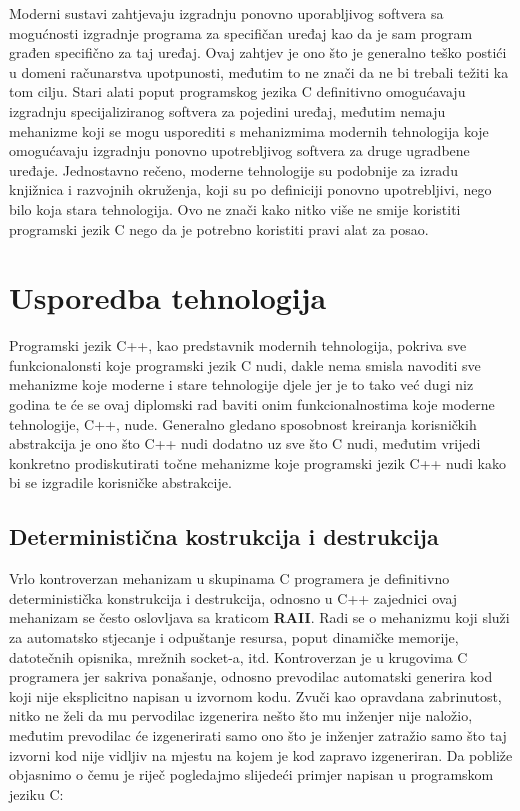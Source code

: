 Moderni sustavi zahtjevaju izgradnju ponovno uporabljivog softvera sa mogućnosti izgradnje programa za specifičan uređaj kao da je sam program građen specifično za taj uređaj. Ovaj zahtjev je ono što je generalno teško postići u domeni računarstva upotpunosti, međutim to ne znači da ne bi trebali težiti ka tom cilju. Stari alati poput programskog jezika C definitivno omogućavaju izgradnju specijaliziranog softvera za pojedini uređaj, međutim nemaju mehanizme koji se mogu usporediti s mehanizmima modernih tehnologija koje omogućavaju izgradnju ponovno upotrebljivog softvera za druge ugradbene uređaje. Jednostavno rečeno, moderne tehnologije su podobnije za izradu knjižnica i razvojnih okruženja, koji su po definiciji ponovno upotrebljivi, nego bilo koja stara tehnologija. Ovo ne znači kako nitko više ne smije koristiti programski jezik C nego da je potrebno koristiti pravi alat za posao. 

\section{Usporedba tehnologija}
Programski jezik C++, kao predstavnik modernih tehnologija, pokriva sve funkcionalonsti koje programski jezik C nudi, dakle nema smisla navoditi sve mehanizme koje moderne i stare tehnologije djele jer je to tako već dugi niz godina te će se ovaj diplomski rad baviti onim funkcionalnostima koje moderne tehnologije, C++, nude. Generalno gledano sposobnost kreiranja korisničkih abstrakcija je ono što C++ nudi dodatno uz sve što C nudi, međutim vrijedi konkretno prodiskutirati točne mehanizme koje programski jezik C++ nudi kako bi se izgradile korisničke abstrakcije. 

\subsection{Deterministična kostrukcija i destrukcija}
Vrlo kontroverzan mehanizam u skupinama C programera je definitivno deterministička konstrukcija i destrukcija, odnosno u C++ zajednici ovaj mehanizam se često oslovljava sa kraticom \textbf{RAII}. Radi se o mehanizmu koji služi za automatsko stjecanje i odpuštanje resursa, poput dinamičke memorije, datotečnih opisnika, mrežnih socket-a, itd. Kontroverzan je u krugovima C programera jer sakriva ponašanje, odnosno prevodilac automatski generira kod koji nije eksplicitno napisan u izvornom kodu. Zvuči kao opravdana zabrinutost, nitko ne želi da mu pervodilac izgenerira nešto što mu inženjer nije naložio, međutim prevodilac će izgenerirati samo ono što je inženjer zatražio samo što taj izvorni kod nije vidljiv na mjestu na kojem je kod zapravo izgeneriran. Da pobliže objasnimo o čemu je riječ pogledajmo slijedeći primjer napisan u programskom jeziku C:

